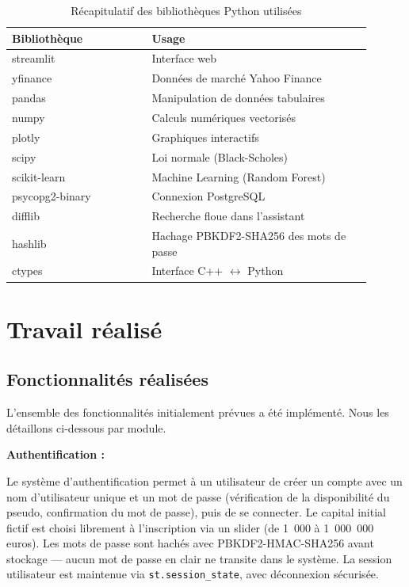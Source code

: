 \documentclass[a4paper, 12pt, twoside]{article}
\begin{document}
\begin{table}[h]
\begin{center}
\begin{tabular}{|p{0.35\linewidth}|p{0.55\linewidth}|}
\hline
\textbf{Bibliothèque} & \textbf{Usage} \\
\hline
streamlit & Interface web \\
\hline
yfinance & Données de marché Yahoo Finance \\
\hline
pandas & Manipulation de données tabulaires \\
\hline
numpy & Calculs numériques vectorisés \\
\hline
plotly & Graphiques interactifs \\
\hline
scipy & Loi normale (Black-Scholes) \\
\hline
scikit-learn & Machine Learning (Random Forest) \\
\hline
psycopg2-binary & Connexion PostgreSQL \\
\hline
difflib & Recherche floue dans l'assistant \\
\hline
hashlib & Hachage PBKDF2-SHA256 des mots de passe \\
\hline
ctypes & Interface C++ $\leftrightarrow$ Python \\
\hline
\end{tabular}
\end{center}
\caption{Récapitulatif des bibliothèques Python utilisées}
\label{tab:libs}
\end{table}

\section{Travail réalisé}

\subsection{Fonctionnalités réalisées}

L'ensemble des fonctionnalités initialement prévues a été implémenté.
Nous les détaillons ci-dessous par module.

\textbf{Authentification :}

Le système d'authentification permet à un utilisateur de créer un compte
avec un nom d'utilisateur unique et un mot de passe (vérification de la
disponibilité du pseudo, confirmation du mot de passe), puis de se
connecter. Le capital initial fictif est choisi librement à l'inscription
via un slider (de 1~000 à 1~000~000 euros). Les mots de passe sont
hachés avec PBKDF2-HMAC-SHA256 avant stockage --- aucun mot de passe en
clair ne transite dans le système. La session utilisateur est maintenue
via \texttt{st.session\_state}, avec déconnexion sécurisée.
\end{document}
